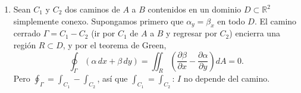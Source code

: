 \documentclass[12pt,a4paper]{article}
\newcommand{\paren}[1]{\left( #1 \right)}
\begin{document}
    \begin{solucion}
        \begin{enumerate}
            \item[a)] Sean $C_{1}$ y $C_{2}$ dos caminos de $A$ a $B$ contenidos en un dominio
            $D\subset\mathbb{R}^{2}$ simplemente conexo. Supongamos primero que
            $\alpha_{y}=\beta_{x}$ en todo $D$. El camino cerrado $\Gamma=C_{1}-C_{2}$ (ir por
            $C_{1}$ de $A$ a $B$ y regresar por $C_{2}$) encierra una región $R\subset D$, y por
            el teorema de Green,
            \begin{equation*}
                \oint_{\Gamma}\left(\alpha\,dx+\beta\,dy\right)=\iint_{R}\paren{\frac{\partial\beta}{\partial x}-\frac{\partial\alpha}{\partial y}}dA=0.
            \end{equation*}
            Pero $\oint_{\Gamma}=\int_{C_{1}}-\int_{C_{2}}$, así que $\int_{C_{1}}=\int_{C_{2}}$:
            $I$ no depende del camino.


\end{enumerate}
\end{solucion}
\end{document}
